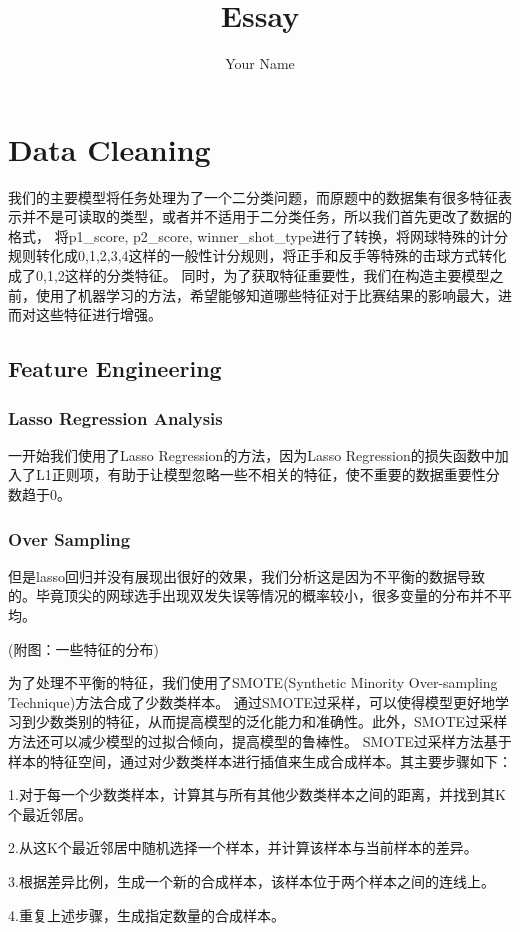 \documentclass{ctexart}
\title{Essay}
\author{Your Name}
\date{}
\begin{document}
\maketitle

\section{Data Cleaning}
我们的主要模型将任务处理为了一个二分类问题，而原题中的数据集有很多特征表示并不是可读取的类型，或者并不适用于二分类任务，所以我们首先更改了数据的格式，
将p1\_score, p2\_score, winner\_shot\_type进行了转换，将网球特殊的计分规则转化成0,1,2,3,4这样的一般性计分规则，将正手和反手等特殊的击球方式转化成了0,1,2这样的分类特征。
同时，为了获取特征重要性，我们在构造主要模型之前，使用了机器学习的方法，希望能够知道哪些特征对于比赛结果的影响最大，进而对这些特征进行增强。
\subsection{Feature Engineering}
\subsubsection{Lasso Regression Analysis}
一开始我们使用了Lasso Regression的方法，因为Lasso Regression的损失函数中加入了L1正则项，有助于让模型忽略一些不相关的特征，使不重要的数据重要性分数趋于0。


\subsubsection{Over Sampling}
但是lasso回归并没有展现出很好的效果，我们分析这是因为不平衡的数据导致的。毕竟顶尖的网球选手出现双发失误等情况的概率较小，很多变量的分布并不平均。
\par (附图：一些特征的分布)\par
为了处理不平衡的特征，我们使用了SMOTE(Synthetic Minority Over-sampling Technique)方法合成了少数类样本。
通过SMOTE过采样，可以使得模型更好地学习到少数类别的特征，从而提高模型的泛化能力和准确性。此外，SMOTE过采样方法还可以减少模型的过拟合倾向，提高模型的鲁棒性。
SMOTE过采样方法基于样本的特征空间，通过对少数类样本进行插值来生成合成样本。其主要步骤如下：\par
1.对于每一个少数类样本，计算其与所有其他少数类样本之间的距离，并找到其K个最近邻居。\par
2.从这K个最近邻居中随机选择一个样本，并计算该样本与当前样本的差异。\par
3.根据差异比例，生成一个新的合成样本，该样本位于两个样本之间的连线上。\par
4.重复上述步骤，生成指定数量的合成样本。
\end{document}
